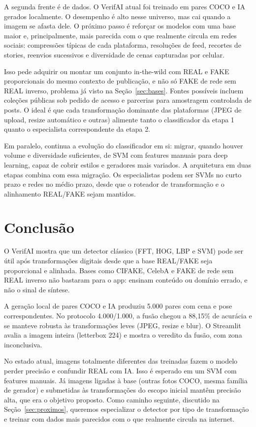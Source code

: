 \documentclass[12pt]{article}
\begin{document}
A segunda frente é de dados. O VerifAI atual foi treinado em pares COCO e IA gerados localmente. O desempenho é alto nesse universo, mas cai quando a imagem se afasta dele. O próximo passo é reforçar os modelos com uma base maior e, principalmente, mais parecida com o que realmente circula em redes sociais: compressões típicas de cada plataforma, resoluções de feed, recortes de stories, reenvios sucessivos e diversidade de cenas capturadas por celular.

Isso pede adquirir ou montar um conjunto in-the-wild com REAL e FAKE proporcionais do mesmo contexto de publicação, e não só FAKE de rede sem REAL inverso, problema já visto na Seção~\ref{sec:bases}. Fontes possíveis incluem coleções públicas sob pedido de acesso e parcerias para amostragem controlada de posts. O ideal é que cada transformação dominante das plataformas (JPEG de upload, resize automático e outras) alimente tanto o classificador da etapa 1 quanto o especialista correspondente da etapa 2.

Em paralelo, continua a evolução do classificador em si: migrar, quando houver volume e diversidade suficientes, de SVM com features manuais para deep learning, capaz de cobrir estilos e geradores mais variados. A arquitetura em duas etapas combina com essa migração. Os especialistas podem ser SVMs no curto prazo e redes no médio prazo, desde que o roteador de transformação e o alinhamento REAL/FAKE sejam mantidos.

\section{Conclusão}

O VerifAI mostra que um detector clássico (FFT, HOG, LBP e SVM) pode ser útil após transformações digitais desde que a base REAL/FAKE seja proporcional e alinhada. Bases como CIFAKE, CelebA e FAKE de rede sem REAL inverso não bastaram para o app: ensinam conteúdo ou domínio errado, e não o sinal de síntese.

A geração local de pares COCO e IA produziu 5{.}000 pares com cena e pose correspondentes. No protocolo 4{.}000/1{.}000, a fusão chegou a 88,15\% de acurácia e se manteve robusta às transformações leves (JPEG, resize e blur). O Streamlit avalia a imagem inteira (letterbox 224) e mostra o veredito da fusão, com zona inconclusiva.

No estado atual, imagens totalmente diferentes das treinadas fazem o modelo perder precisão e confundir REAL com IA. Isso é esperado em um SVM com features manuais. Já imagens ligadas à base (outras fotos COCO, mesma família de gerador) e submetidas às transformações do escopo inicial mantêm precisão alta, que era o objetivo proposto. Como caminho seguinte, discutido na Seção~\ref{sec:proximos}, queremos especializar o detector por tipo de transformação e treinar com dados mais parecidos com o que realmente circula na internet.
\end{document}
